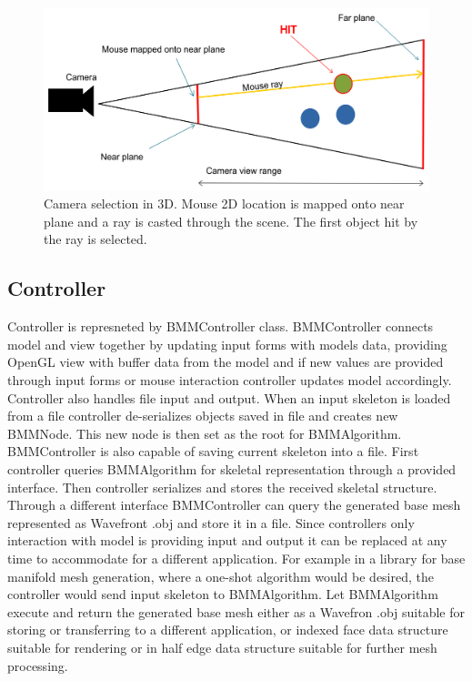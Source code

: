 \begin{figure}[h]
    \centering
    \includegraphics[width=\textwidth]{images/camera_selection}
    \caption[Camera selection]{Camera selection in 3D. Mouse 2D location is mapped onto near plane and a ray is casted through the scene. The first object hit by the ray is selected.}
    \label{fig:camera_selection}
\end{figure}

\subsection{Controller}

Controller is represneted by BMMController class.
BMMController connects model and view together by updating input forms with models data, providing OpenGL view with buffer data from the model and if new values are provided through input forms or mouse interaction controller updates model accordingly.
Controller also handles file input and output.
When an input skeleton is loaded from a file controller de-serializes objects saved in file and creates new BMMNode.
This new node is then set as the root for BMMAlgorithm.
BMMController is also capable of saving current skeleton into a file.
First controller queries BMMAlgorithm for skeletal representation through a provided interface.
Then controller serializes and stores the received skeletal structure.
Through a different interface BMMController can query the generated base mesh represented as Wavefront .obj and store it in a file.
Since controllers only interaction with model is providing input and output it can be replaced at any time to accommodate for a different application.
For example in a library for base manifold mesh generation, where a one-shot algorithm would be desired, the controller would  send input skeleton to BMMAlgorithm.
Let BMMAlgorithm execute and return the generated base mesh either as a Wavefron .obj suitable for storing or transferring to a different application, or indexed face data structure suitable for rendering or in half edge data structure suitable for further mesh processing.


